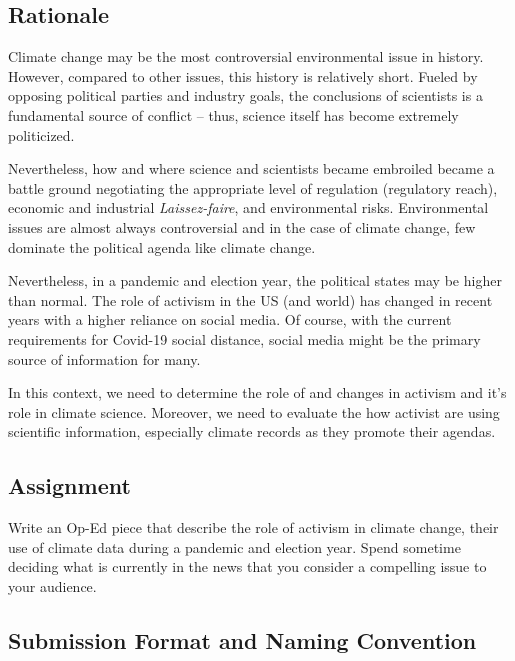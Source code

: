 
\subsection{Rationale}

Climate change may be the most controversial environmental issue in history. However, compared to other issues, this history is relatively short. Fueled by opposing political parties and industry goals, the conclusions of scientists is a fundamental source of conflict -- thus, science itself has become extremely politicized. 

Nevertheless, how and where science and scientists became embroiled became a battle ground negotiating the appropriate level of regulation (regulatory reach), economic and industrial \textit{Laissez-faire}, and environmental risks. Environmental issues are almost always controversial and in the case of climate change, few dominate the political agenda like climate change. 

Nevertheless, in a pandemic and election year, the political states may be higher than normal. The role of activism in the US (and world) has changed in recent years with a higher reliance on social media. Of course, with the current requirements for Covid-19 social distance, social media might be the primary source of information for many. 

In this context, we need to determine the role of and changes in activism and it's role in climate science. Moreover, we need to evaluate the how activist are using scientific information, especially climate records as they promote their agendas.

\subsection{Assignment}

Write an Op-Ed piece that describe the role of activism in climate change, their use of climate data during a pandemic and election year. %
Spend sometime deciding what is currently in the news that you consider a compelling issue to your audience.

\subsection{Submission Format and Naming Convention}

